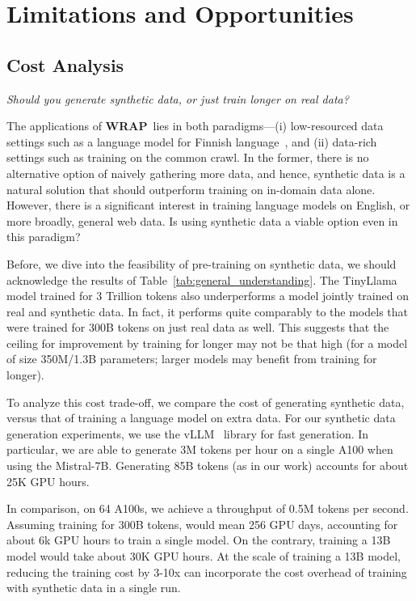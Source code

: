 \documentclass[table]{article}
\newcommand{\ours}{\textbf{WRAP}}
\begin{document}
\section{Limitations and Opportunities}

\subsection{Cost Analysis}
\emph{Should you generate synthetic data, or just train longer on real data?}

The applications of \ours~lies in both paradigms---(i) low-resourced data settings such as a language model for Finnish language~\citep{luukkonen2023fingpt}, and (ii) data-rich settings such as training on the common crawl.
In the former, there is no alternative option of naively gathering more data, and hence, synthetic data is a natural solution that should outperform training on in-domain data alone. However, there is a significant interest in training language models on English, or more broadly, general web data. Is using synthetic data a viable option even in this paradigm?

Before, we dive into the feasibility of pre-training on synthetic data, we should acknowledge the results of Table~\ref{tab:general_understanding}. The TinyLlama model trained for 3 Trillion tokens also underperforms a model jointly trained on real and synthetic data. In fact, it performs quite comparably to the models that were trained for 300B tokens on just real data as well. This suggests that the ceiling for improvement by training for longer may not be that high (for a model of size 350M/1.3B parameters; larger models may benefit from training for longer).

To analyze this cost trade-off, we compare the cost of generating synthetic data, versus that of training a language model on extra data.
For our synthetic data generation experiments, we use the vLLM~\citep{kwon2023efficient} library for fast generation. In particular, we are able to generate 3M tokens per hour on a single A100 when using the Mistral-7B. Generating 85B tokens (as in our work) accounts for about 25K GPU hours. 

In comparison, on 64 A100s, we achieve a throughput of 0.5M tokens per second. Assuming training for 300B tokens, would mean 256 GPU days, accounting for about 6k GPU hours to train a single model. On the contrary, training a 13B model would take about 30K GPU hours. At the scale of training a 13B model, reducing the training cost by 3-10x can incorporate the cost overhead of training with synthetic data in a single run. 
\end{document}
